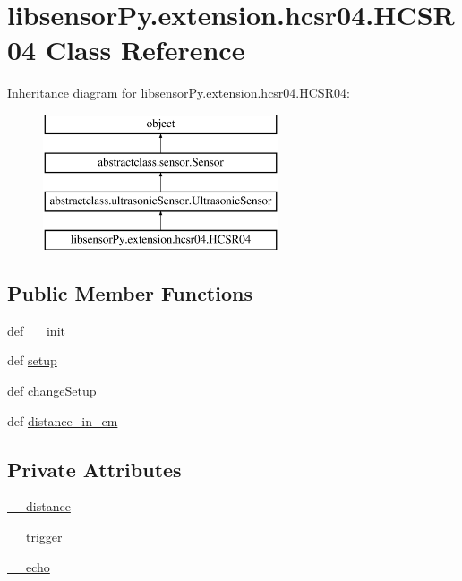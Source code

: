 \hypertarget{classlibsensorPy_1_1extension_1_1hcsr04_1_1HCSR04}{}\section{libsensor\+Py.\+extension.\+hcsr04.\+H\+C\+S\+R04 Class Reference}
\label{classlibsensorPy_1_1extension_1_1hcsr04_1_1HCSR04}
Inheritance diagram for libsensor\+Py.\+extension.\+hcsr04.\+H\+C\+S\+R04\+:\begin{figure}[H]
\begin{center}
\leavevmode
\includegraphics[height=4.000000cm]{classlibsensorPy_1_1extension_1_1hcsr04_1_1HCSR04}
\end{center}
\end{figure}
\subsection*{Public Member Functions}
\begin{DoxyCompactItemize}
\item 
def \hyperlink{classlibsensorPy_1_1extension_1_1hcsr04_1_1HCSR04_aa7e366748c86d4833833bdc41927a7f1}{\+\_\+\+\_\+init\+\_\+\+\_\+}
\item 
def \hyperlink{classlibsensorPy_1_1extension_1_1hcsr04_1_1HCSR04_a774e81699df2a28e31ac254ccfa2e98b}{setup}
\item 
def \hyperlink{classlibsensorPy_1_1extension_1_1hcsr04_1_1HCSR04_a573e1fde4609a9e3f273b979b31b15c7}{change\+Setup}
\item 
def \hyperlink{classlibsensorPy_1_1extension_1_1hcsr04_1_1HCSR04_a52029f0078d2e788554c8a445b938a5b}{distance\+\_\+in\+\_\+cm}
\end{DoxyCompactItemize}
\subsection*{Private Attributes}
\begin{DoxyCompactItemize}
\item 
\hyperlink{classlibsensorPy_1_1extension_1_1hcsr04_1_1HCSR04_a6adf46d3e7a7dbdaf48f2535068ddc56}{\+\_\+\+\_\+distance}
\item 
\hyperlink{classlibsensorPy_1_1extension_1_1hcsr04_1_1HCSR04_a205d85a2a85f0a07917438d5b3776a1e}{\+\_\+\+\_\+trigger}
\item 
\hyperlink{classlibsensorPy_1_1extension_1_1hcsr04_1_1HCSR04_a7b7c1a2023980ed4485ba5f1c913dacd}{\+\_\+\+\_\+echo}
\end{DoxyCompactItemize}


